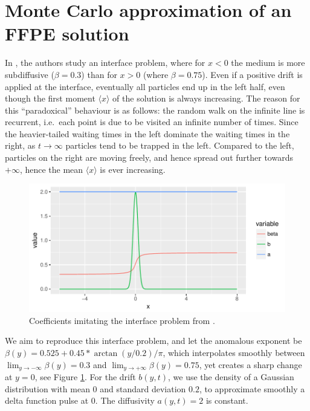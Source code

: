 \documentclass[a4paper,12pt]{elsarticle}
\numberwithin{equation}{section}
\theoremstyle{plain}
\theoremstyle{definition}
\theoremstyle{remark}
\numberwithin{equation}{section}
\newcommand{\1}{\mathbf 1}
\begin{document}
\section{Monte Carlo approximation of an FFPE solution}
\label{sec:examples}

In \cite{Korabel2010}, the authors study an interface problem, where for 
$x<0$ the medium is more subdiffusive ($\beta = 0.3$) than for $x>0$ 
(where $\beta = 0.75$).  Even if a positive drift is applied at the 
interface, eventually all particles end up in the left half, even though 
the first moment $\langle x \rangle$ of the solution is always increasing. 
The reason for this ``paradoxical'' behaviour is as follows: the random 
walk on the infinite line is recurrent, i.e.\ each point is due to be 
visited an infinite number of times. Since the heavier-tailed waiting 
times in the left dominate the waiting times in the right, as $t \to 
\infty$ particles tend to be trapped in the left. Compared to the left, 
particles on the right are moving freely, and hence spread out further 
towards $+\infty$, hence the mean $\langle x \rangle$ is ever increasing. 

\begin{figure}
  \centering
  \includegraphics{beta_b}
  \caption{\label{fig:beta_b}Coefficients imitating the interface problem from \cite{Korabel2010}.}
\end{figure}

We aim to reproduce this interface problem, and 
let the anomalous exponent be $\beta(y) = 0.525 + 0.45 * \arctan(y/0.2)/ \pi$, 
which interpolates smoothly between $\lim_{y \to -\infty} \beta(y) = 0.3$ 
and $\lim_{y \to +\infty} \beta(y) = 0.75$, yet creates a sharp change at $y=0$, see Figure \ref{fig:beta_b}.
For the drift $b(y,t)$, we use the density of a Gaussian distribution with 
mean $0$ and standard deviation $0.2$, to approximate smoothly a 
delta function pulse at $0$.
The diffusivity $a(y,t) = 2$ is constant. 
\end{document}
